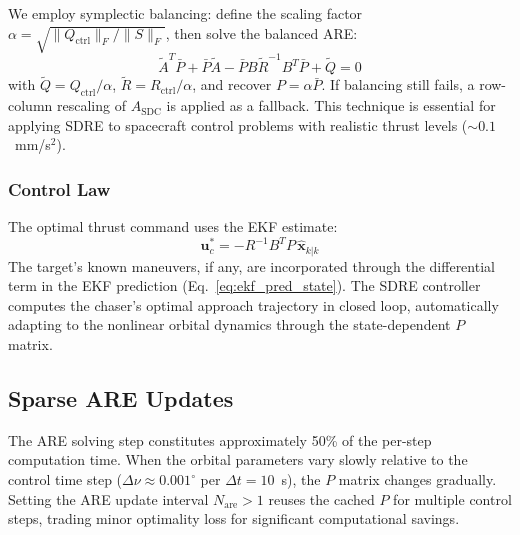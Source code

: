 \documentclass[preprint,3p,times]{elsarticle}
\begin{document}
We employ symplectic balancing: define the scaling factor $\alpha = \sqrt{\|Q_{\text{ctrl}}\|_F / \|S\|_F}$, then solve the balanced ARE:
\begin{equation}
\tilde{A}^T \bar{P} + \bar{P} \tilde{A} - \bar{P} B \tilde{R}^{-1} B^T \bar{P} + \tilde{Q} = 0
\end{equation}
with $\tilde{Q} = Q_{\text{ctrl}}/\alpha$, $\tilde{R} = R_{\text{ctrl}}/\alpha$, and recover $P = \alpha \bar{P}$. If balancing still fails, a row-column rescaling of $A_{\text{SDC}}$ is applied as a fallback. This technique is essential for applying SDRE to spacecraft control problems with realistic thrust levels (${\sim}0.1$~mm/s$^2$).

\subsubsection{Control Law}
The optimal thrust command uses the EKF estimate:
\begin{equation}
\mathbf{u}_c^* = -R^{-1} B^T P \,\hat{\mathbf{x}}_{k|k} \label{eq:uc_final}
\end{equation}
The target's known maneuvers, if any, are incorporated through the differential term in the EKF prediction (Eq.~\ref{eq:ekf_pred_state}). The SDRE controller computes the chaser's optimal approach trajectory in closed loop, automatically adapting to the nonlinear orbital dynamics through the state-dependent $P$ matrix.

\subsection{Sparse ARE Updates}

The ARE solving step constitutes approximately 50\% of the per-step computation time. When the orbital parameters vary slowly relative to the control time step ($\Delta\nu \approx 0.001^\circ$ per $\Delta t = 10$~s), the $P$ matrix changes gradually. Setting the ARE update interval $N_{\text{are}} > 1$ reuses the cached $P$ for multiple control steps, trading minor optimality loss for significant computational savings.
\end{document}
